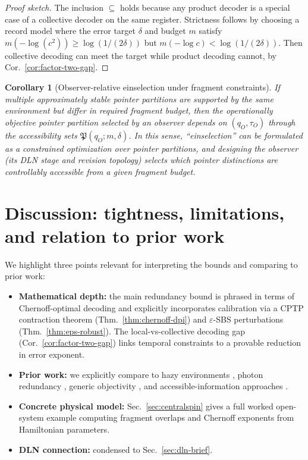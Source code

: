 \documentclass[11pt]{article}
\newcommand{\1}{\mathbf{1}}
\theoremstyle{definition}
\theoremstyle{plain}
\newtheorem{corollary}{Corollary}
\begin{document}
\begin{proof}[Proof sketch]
The inclusion $\subseteq$ holds because any product decoder is a special case of a collective decoder on the same register.
Strictness follows by choosing a record model where the error target $\delta$ and budget $m$ satisfy
$m(-\log(c^2))\ge \log(1/(2\delta))$ but $m(-\log c)<\log(1/(2\delta))$.
Then collective decoding can meet the target while product decoding cannot, by Cor.~\ref{cor:factor-two-gap}.
\end{proof}

\begin{corollary}[Observer-relative einselection under fragment constraints]
\label{cor:observer-relative-einselection}
If multiple approximately stable pointer partitions are supported by the same environment but differ in required fragment budget, then the \emph{operationally objective} pointer partition selected by an observer depends on $(q_O,\tau_O)$ through the accessibility sets $\mathfrak{P}(q_O;m,\delta)$.
In this sense, ``einselection'' can be formulated as a constrained optimization over pointer partitions, and designing the observer (its DLN stage and revision topology) selects which pointer distinctions are controllably accessible from a given fragment budget.
\end{corollary}


\section{Discussion: tightness, limitations, and relation to prior work}

We highlight three points relevant for interpreting the bounds and comparing to prior work:

\begin{itemize}[leftmargin=2em]
\item \textbf{Mathematical depth:} the main redundancy bound is phrased in terms of Chernoff-optimal decoding \citep{Audenaert2007,NussbaumSzkola2009} and explicitly incorporates calibration via a CPTP contraction theorem (Thm.~\ref{thm:chernoff-dpi}) and $\varepsilon$-SBS perturbations (Thm.~\ref{thm:eps-robust}).
The local-vs-collective decoding gap (Cor.~\ref{cor:factor-two-gap}) links temporal constraints to a provable reduction in error exponent.
\item \textbf{Prior work:} we explicitly compare to hazy environments \citep{ZwolakQuanZurek2009}, photon redundancy \citep{RiedelZurek2010,RiedelZurek2011}, generic objectivity \citep{BrandaoPianiHorodecki2015,Knott2018}, and accessible-information approaches \citep{Touil2022}.
\item \textbf{Concrete physical model:} Sec.~\ref{sec:centralspin} gives a full worked open-system example computing fragment overlaps and Chernoff exponents from Hamiltonian parameters.
\item \textbf{DLN connection:} condensed to Sec.~\ref{sec:dln-brief}.
\end{itemize}
\end{document}
